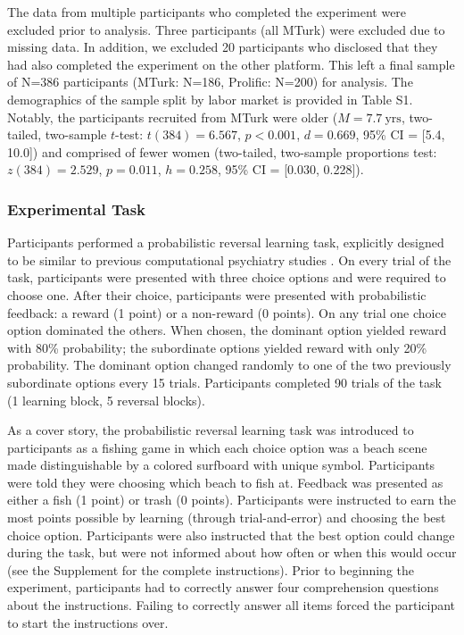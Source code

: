 \documentclass[a4paper,notitlepage,12pt]{article}
\begin{document}
\begin{refsection}[main]
The data from multiple participants who completed the experiment were excluded prior to analysis. Three participants (all MTurk) were excluded due to missing data. In addition, we excluded 20 participants who disclosed that they had also completed the experiment on the other platform. This left a final sample of N=386 participants (MTurk: N=186, Prolific: N=200) for analysis. The demographics of the sample split by labor market is provided in Table S1. Notably, the participants recruited from MTurk were older ($M = 7.7 \ \text{yrs}$, two-tailed, two-sample $t$-test: $t(384)=6.567$, $p<0.001$, $d=0.669$, 95\% CI = [5.4, 10.0]) and comprised of fewer women (two-tailed, two-sample proportions test: $z(384)=2.529$, $p=0.011$, $h=0.258$, 95\% CI = [0.030, 0.228]). 

\subsubsection*{Experimental Task}

Participants performed a probabilistic reversal learning task, explicitly designed to be similar to previous computational psychiatry studies \cite{waltz2007probabilistic, mukherjee_reward_2020}. On every trial of the task, participants were presented with three choice options and were required to choose one. After their choice, participants were presented with probabilistic feedback: a reward (1 point) or a non-reward (0 points). On any trial one choice option dominated the others. When chosen, the dominant option yielded reward with 80\% probability; the subordinate options yielded reward with only 20\% probability. The dominant option changed randomly to one of the two previously subordinate options every 15 trials. Participants completed 90 trials of the task (1 learning block, 5 reversal blocks). 

As a cover story, the probabilistic reversal learning task was introduced to participants as a fishing game in which each choice option was a beach scene made distinguishable by a colored surfboard with unique symbol. Participants were told they were choosing which beach to fish at. Feedback was presented as either a fish (1 point) or trash (0 points). Participants were instructed to earn the most points possible by learning (through trial-and-error) and choosing the best choice option. Participants were also instructed that the best option could change during the task, but were not informed about how often or when this would occur (see the Supplement for the complete instructions). Prior to beginning the experiment, participants had to correctly answer four comprehension questions about the instructions. Failing to correctly answer all items forced the participant to start the instructions over.


\end{refsection}
\end{document}
